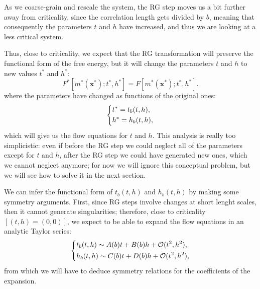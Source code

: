 As we coarse-grain and rescale the system, the RG step moves us a bit further away from criticality, since the correlation length gets divided by \(b\), meaning that consequently the parameters \(t\) and \(h\) have increased, and thus we are looking at a less critical system.

Thus, close to criticality, we expect that the RG transformation will preserve the functional form of the free energy, but it will change the parameters \(t\) and \(h\) to new values \(t^*\) and \(h^*\):
\[
    F^*[m^{*}(\mathbf{x}^*); t^*, h^*] = F[m^{*}(\mathbf{x}^*); t^*, h^*].
\]
where the parameters have changed as functions of the original ones:
\[
    \begin{dcases}
        t^* = t_b(t,h), \\
        h^* = h_b(t,h),
    \end{dcases}
\]
which will give us the flow equations for \(t\) and \(h\). This analysis is really too simplicistic: even if before the RG step we could neglect all of the parameters except for \(t\) and \(h\), after the RG step we could have generated new ones, which we cannot neglect anymore; for now we will ignore this conceptual problem, but we will see how to solve it in the next section.

We can infer the functional form of \(t_b(t,h)\) and \(h_b(t,h)\) by making some symmetry arguments. First, since RG steps involve changes at short lenght scales, then it cannot generate singularities; therefore, close to criticality \([(t,h)=(0,0)]\), we expect to be able to expand the flow equations in an analytic Taylor series:
\[
    \begin{dcases}
        t_b(t,h) \sim A(b) t + B(b) h + \mathcal{O}(t^2, h^2), \\
        h_b(t,h) \sim C(b) t + D(b) h + \mathcal{O}(t^2, h^2),
    \end{dcases}
\]
from which we will have to deduce symmetry relations for the coefficients of the expansion.

